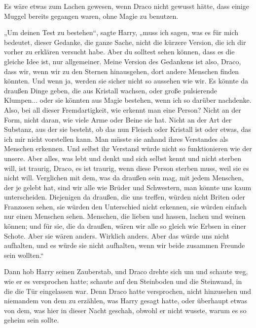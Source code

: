 {Es wäre etwas zum Lachen gewesen, wenn Draco nicht gewusst hätte, dass einige Muggel bereits gegangen waren, ohne Magie zu benutzen.

„Um deinen Test zu bestehen“, sagte Harry, „muss ich sagen, was es für mich bedeutet, dieser Gedanke, die ganze Sache, nicht die kürzere Version, die ich dir vorher zu erklären versucht habe. Aber du solltest sehen können, dass es die gleiche Idee ist, nur allgemeiner. Meine Version des Gedankens ist also, Draco, dass wir, wenn wir zu den Sternen hinausgehen, dort andere Menschen finden könnten. Und wenn ja, werden sie sicher nicht so aussehen wie wir. Es könnte da draußen Dinge geben, die aus Kristall wachsen, oder große pulsierende Klumpen... oder sie könnten aus Magie bestehen, wenn ich so darüber nachdenke. Also, bei all dieser Fremdartigkeit, wie erkennt man eine Person? Nicht an der Form, nicht daran, wie viele Arme oder Beine sie hat. Nicht an der Art der Substanz, aus der sie besteht, ob das nun Fleisch oder Kristall ist oder etwas, das ich mir nicht vorstellen kann. Man müsste sie anhand ihres Verstandes als Menschen erkennen. Und selbst ihr Verstand würde nicht so funktionieren wie der unsere. Aber alles, was lebt und denkt und sich selbst kennt und nicht sterben will, ist traurig, Draco, es ist traurig, wenn diese Person sterben muss, weil sie es nicht will. Verglichen mit dem, was da draußen sein mag, mit jedem Menschen, der je gelebt hat, sind wir alle wie Brüder und Schwestern, man könnte uns kaum unterscheiden. Diejenigen da draußen, die uns treffen, würden nicht Briten oder Franzosen sehen, sie würden den Unterschied nicht erkennen, sie würden einfach nur einen Menschen sehen. Menschen, die lieben und hassen, lachen und weinen können; und für sie, die da draußen, wären wir alle so gleich wie Erbsen in einer Schote. Aber sie wären anders. Wirklich anders. Aber das würde uns nicht aufhalten, und es würde sie nicht aufhalten, wenn wir beide zusammen Freunde sein wollten.“

Dann hob Harry seinen Zauberstab, und Draco drehte sich um und schaute weg, wie er es versprochen hatte; schaute auf den Steinboden und die Steinwand, in die die Tür eingelassen war. Denn Draco hatte versprochen, nicht hinzusehen und niemandem von dem zu erzählen, was Harry gesagt hatte, oder überhaupt etwas von dem, was hier in dieser Nacht geschah, obwohl er nicht wusste, warum es so geheim sein sollte.

}
